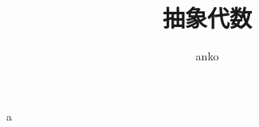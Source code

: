 \documentclass[uplatex,dvipdfmx,a4paper,11pt]{jlreq}
\theoremstyle{plain}
\theoremstyle{definition}
\theoremstyle{plain}
\numberwithin{equation}{section}
\numberwithin{theorem}{section}
\numberwithin{definition}{section}
\numberwithin{note}{section}
\theoremstyle{definition}
\begin{document}
\title{抽象代数}
\author{
  anko
}
\maketitle
\tableofcontents
\clearpage
a
\end{document}
